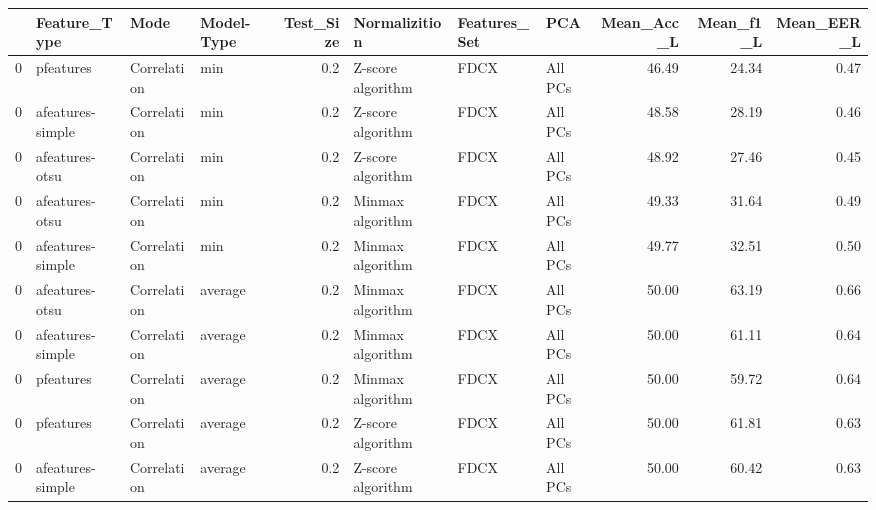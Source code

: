 \begin{tabular}{llllrlllrrr}
\toprule
{} &      Feature\_Type &         Mode & Model-Type &  Test\_Size &      Normalizition & Features\_Set &      PCA &  Mean\_Acc\_L &  Mean\_f1\_L &  Mean\_EER\_L \\
\midrule
0 &         pfeatures &  Correlation &        min &        0.2 &  Z-score algorithm &         FDCX &  All PCs &       46.49 &      24.34 &        0.47 \\
0 &  afeatures-simple &  Correlation &        min &        0.2 &  Z-score algorithm &         FDCX &  All PCs &       48.58 &      28.19 &        0.46 \\
0 &    afeatures-otsu &  Correlation &        min &        0.2 &  Z-score algorithm &         FDCX &  All PCs &       48.92 &      27.46 &        0.45 \\
0 &    afeatures-otsu &  Correlation &        min &        0.2 &   Minmax algorithm &         FDCX &  All PCs &       49.33 &      31.64 &        0.49 \\
0 &  afeatures-simple &  Correlation &        min &        0.2 &   Minmax algorithm &         FDCX &  All PCs &       49.77 &      32.51 &        0.50 \\
0 &    afeatures-otsu &  Correlation &    average &        0.2 &   Minmax algorithm &         FDCX &  All PCs &       50.00 &      63.19 &        0.66 \\
0 &  afeatures-simple &  Correlation &    average &        0.2 &   Minmax algorithm &         FDCX &  All PCs &       50.00 &      61.11 &        0.64 \\
0 &         pfeatures &  Correlation &    average &        0.2 &   Minmax algorithm &         FDCX &  All PCs &       50.00 &      59.72 &        0.64 \\
0 &         pfeatures &  Correlation &    average &        0.2 &  Z-score algorithm &         FDCX &  All PCs &       50.00 &      61.81 &        0.63 \\
0 &  afeatures-simple &  Correlation &    average &        0.2 &  Z-score algorithm &         FDCX &  All PCs &       50.00 &      60.42 &        0.63 \\
\bottomrule
\end{tabular}

